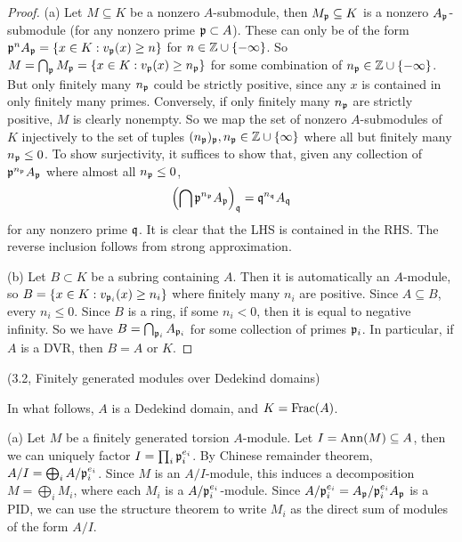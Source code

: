 \documentclass[11pt]{amsart}
\begin{document}
\begin{proof}
(a) Let $M\subseteq K$ be a nonzero $A$-submodule, then $M_{\mathfrak{p}} \subseteq K$ is a nonzero $A_{\mathfrak{p}}$-submodule (for any nonzero prime $\mathfrak{p}\subset A$). These can only be of the form $\mathfrak{p}^n A_{\mathfrak{p}} = \{x\in K: v_{\mathfrak{p}}(x) \ge n\}$ for $n \in \mathbb{Z}\cup\{-\infty\}$. So $M = \bigcap_{\mathfrak{p}} M_{\mathfrak{p}} = \{x\in K: v_{\mathfrak{p}}(x) \ge n_{\mathfrak{p}}\}$ for some combination of $n_{\mathfrak{p}}\in \mathbb{Z}\cup\{-\infty\}$. But only finitely many $n_{\mathfrak{p}}$ could be strictly positive, since any $x$ is contained in only finitely many primes. Conversely, if only finitely many $n_{\mathfrak{p}}$ are strictly positive, $M$ is clearly nonempty. So we map the set of nonzero $A$-submodules of $K$ injectively to the set of tuples $(n_{\mathfrak{p}})_{\mathfrak{p}}, n_{\mathfrak{p}}\in\mathbb{Z}\cup\{\infty\}$ where all but finitely many $n_{\mathfrak{p}} \le 0$. To show surjectivity, it suffices to show that, given any collection of $\mathfrak{p}^{n_{\mathfrak{p}}} A_{\mathfrak{p}}$ where almost all $n_{\mathfrak{p}} \le 0$,
\[\left( \bigcap \mathfrak{p}^{n_{\mathfrak{p}}} A_{\mathfrak{p}} \right)_{\mathfrak{q}} = \mathfrak{q}^{n_{\mathfrak{q}}}A_{\mathfrak{q}}\]
for any nonzero prime $\mathfrak{q}$. It is clear that the LHS is contained in the RHS. The reverse inclusion follows from strong approximation.

(b) Let $B\subset K$ be a subring containing $A$. Then it is automatically an $A$-module, so $B = \{x\in K: v_{\mathfrak{p}_i}(x) \ge n_i\}$ where finitely many $n_i$ are positive. Since $A\subseteq B$, every $n_i\le 0$. Since $B$ is a ring, if some $n_i<0$, then it is equal to negative infinity. So we have $B = \bigcap_{\mathfrak{p}_i} A_{\mathfrak{p}_i}$ for some collection of primes $\mathfrak{p}_i$. In particular, if $A$ is a DVR, then $B = A$ or $K$.
\end{proof}

(3.2, Finitely generated modules over Dedekind domains)

In what follows, $A$ is a Dedekind domain, and $K = \operatorname{Frac}(A)$.

(a) Let $M$ be a finitely generated torsion $A$-module. Let $I = \operatorname{Ann}(M) \subseteq A$, then we can uniquely factor $I = \prod_i \mathfrak{p}_i^{e_i}$. By Chinese remainder theorem, $A/I = \bigoplus_i A/\mathfrak{p}_i^{e_i}$. Since $M$ is an $A/I$-module, this induces a decomposition $M = \bigoplus_i M_i$, where each $M_i$ is a $A/\mathfrak{p}_i^{e_i}$-module. Since $A/\mathfrak{p}_i^{e_i} = A_{\mathfrak{p}}/\mathfrak{p}_i^{e_i}A_{\mathfrak{p}}$ is a PID, we can use the structure theorem to write $M_i$ as the direct sum of modules of the form $A/I$.
\end{document}
